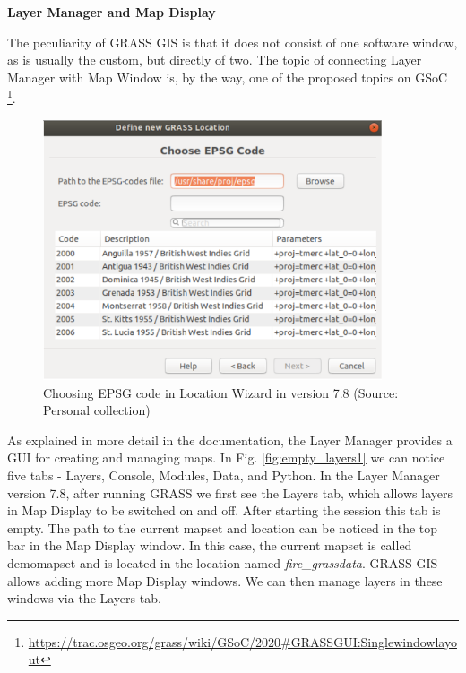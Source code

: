 \documentclass[a4paper,10pt,twoside]{article}
\begin{document}
\bigskip
\noindent \textbf {Layer Manager and Map Display}

\noindent The peculiarity of GRASS GIS is that it does not consist of one software window, as is usually the custom, but directly of two. The topic of connecting Layer Manager with Map Window is, by the way, one of the proposed topics on GSoC \footnote{\url{https://trac.osgeo.org/grass/wiki/GSoC/2020\#GRASSGUI:Singlewindowlayout}}. 

\vspace{0.3cm}
\begin{figure}[hbt!]
\begin{center}
\includegraphics[width=10cm]{../pictures/loc_wizard_sour_pred.png} 
\caption[Choosing EPSG code in Location Wizard in version 7.8]{Choosing EPSG code in Location Wizard in version 7.8 (Source: Personal collection)}
\label{fig:loc_wizard_sour_pred}
\end{center}
\end{figure}

\newpage
\noindent As explained in more detail in the documentation, the Layer Manager provides a GUI for creating and managing maps. In Fig. \ref{fig:empty_layers1} we can notice five tabs - Layers, Console, Modules, Data, and Python.
In the Layer Manager version 7.8, after running GRASS we first see the Layers tab, which allows layers in Map Display to be switched on and off. After starting the session this tab is empty. The path to the current mapset and location can be noticed in the top bar in the Map Display window. In this case, the current mapset is called demomapset and is located in the location named \textit{fire\_grassdata}. GRASS GIS allows adding more Map Display windows. We can then manage layers in these windows via the Layers tab.
\end{document}
